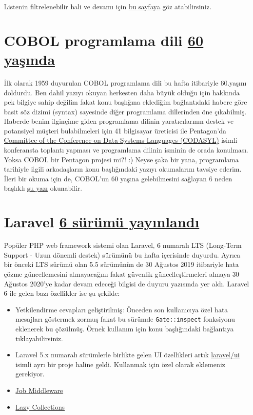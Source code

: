 \documentclass[11pt]{article}
\begin{document}
Listenin filtrelenebilir hali ve devamı için \href{https://spectrum.ieee.org/static/interactive-the-top-programming-languages-2019}{bu sayfaya} göz atabilirsiniz.
\section{COBOL programlama dili \href{https://www.zdnet.com/article/cobol-turns-60-why-it-will-outlive-us-all/}{60 yaşında}}
\label{sec:org1555711}
İlk olarak 1959 duyurulan COBOL programlama dili bu hafta itibariyle 60.yaşını
doldurdu. Ben dahil yazıyı okuyan herkesten daha büyük olduğu için hakkında pek
bilgiye sahip değilim fakat konu başlığına eklediğim bağlantıdaki habere göre
basit söz dizimi (syntax) sayesinde diğer programlama dillerinden öne
çıkabilmiş. Haberde benim ilginçime giden programlama dilinin yaratıcılarının
destek ve potansiyel müşteri bulabilmeleri için 41 bilgisayar üreticisi ile
Pentagon'da \href{https://ieeexplore.ieee.org/document/4640600?reload=true}{Committee of the Conference on Data Systems Languages (CODASYL)}
isimli konferansta toplantı yapması ve programlama dilinin isminin de orada
konulması. Yoksa COBOL bir Pentagon projesi mi?! :) Neyse şaka bir yana,
programlama tarihiyle ilgili arkadaşların konu başlığındaki yazıyı okumalarını
tavsiye ederim. İleri bir okuma için de, COBOL'un 60 yaşına gelebilmesini
sağlayan 6 neden başlıklı \href{https://www.eweek.com/development/six-reasons-cobol-has-survived-to-age-60}{şu yazı} okunabilir.
\section{Laravel \href{https://laravel-news.com/laravel-6}{6 sürümü yayınlandı}}
\label{sec:orgee54dbe}
Popüler PHP web framework sistemi olan Laravel, 6 numaralı LTS (Long-Term
Support - Uzun dönemli destek) sürümünü bu hafta içerisinde duyurdu. Ayrıca bir
önceki LTS sürümü olan 5.5 sürümünün de 30 Ağustos 2019 itibariyle hata çözme
güncellemesini almayacağını fakat güvenlik güncelleştirmeleri almaya 30 Ağustos
2020'ye kadar devam edeceği bilgisi de duyuru yazısında yer aldı. Laravel 6 ile
gelen bazı özellikler ise şu şekilde:

\begin{itemize}
\item Yetkilendirme cevapları geliştirilmiş: Önceden son kullanıcıya özel hata
mesajları göstermek zormuş fakat bu sürümde \texttt{Gate::inspect} fonksiyonu
eklenerek bu çözülmüş. Örnek kullanım için konu başlığındaki bağlantıya
tıklayabilirsiniz.
\item Laravel 5.x numaralı sürümlerle birlikte gelen UI özellikleri artık
\href{https://github.com/laravel/ui}{laravel/ui} isimli ayrı bir proje haline geldi. Kullanmak için özel olarak
eklemeniz gerekiyor.
\item \href{https://laravel-news.com/job-middleware-is-coming-to-laravel-6}{Job Middleware}
\item \href{https://laravel.com/docs/6.0/collections\#lazy-collections}{Lazy Collections}
\end{itemize}
\end{document}
